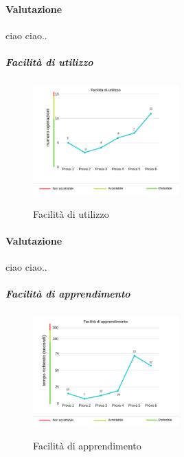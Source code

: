 	\paragraph*{Valutazione} ciao ciao..
	\pagebreak
	\subparagraph{Facilità di utilizzo}
	\begin{center}
		\begin{figure}[h] 
			\centering 
			\includegraphics[width=0.5\textwidth]{res/images/new/facilitaUtilizzo.png}\\
			\caption{Facilità di utilizzo}
		\end{figure}
	\end{center}
	\paragraph*{Valutazione} ciao ciao..
	\pagebreak
	\subparagraph{Facilità di apprendimento}
	\begin{center}
		\begin{figure}[h] 
			\centering 
			\includegraphics[width=0.5\textwidth]{res/images/new/facilitaApprendimento.png}\\
			\caption{Facilità di apprendimento}
		\end{figure}
	\end{center}

